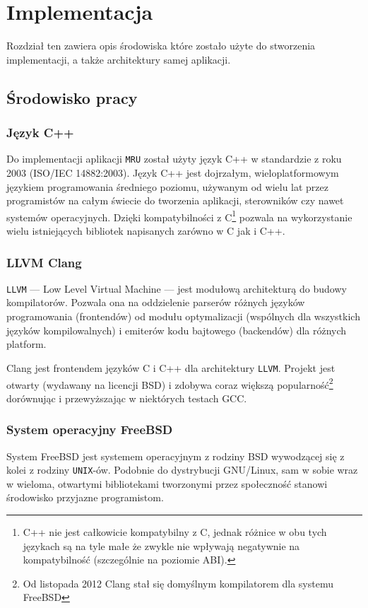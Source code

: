 \chapter{Implementacja}
\par
Rozdział ten zawiera opis środowiska które zostało użyte do stworzenia implementacji, a także architektury samej aplikacji.

\section{Środowisko pracy}

\subsection{Język C++}
\par
Do implementacji aplikacji \texttt{MRU} został użyty język C++ w standardzie z roku 2003 (ISO/IEC 14882:2003).
Język C++ jest dojrzałym, wieloplatformowym językiem programowania średniego poziomu, używanym od wielu lat przez programistów na całym świecie do tworzenia aplikacji, sterowników czy nawet systemów operacyjnych. Dzięki kompatybilności z C\footnote{C++ nie jest całkowicie kompatybilny z  C, jednak różnice w obu tych językach są na tyle małe że zwykle nie wpływają negatywnie na kompatybilność (szczególnie na poziomie ABI).} pozwala na wykorzystanie wielu istniejących bibliotek napisanych zarówno w C jak i C++.

\subsection{LLVM Clang}
\par
\texttt{LLVM} --- Low Level Virtual Machine --- jest modułową architekturą do budowy kompilatorów. Pozwala ona na oddzielenie parserów różnych języków programowania (frontendów) od modułu optymalizacji (wspólnych dla wszystkich języków kompilowalnych) i emiterów kodu bajtowego (backendów) dla różnych platform.

\par
Clang jest frontendem języków C i C++ dla architektury \texttt{LLVM}. Projekt jest otwarty (wydawany na licencji BSD) i zdobywa coraz większą popularność\footnote{Od listopada 2012 Clang stał się domyślnym kompilatorem dla systemu FreeBSD} dorównując i przewyższając w niektórych testach GCC.

\subsection{System operacyjny FreeBSD}
\par
System FreeBSD jest systemem operacyjnym z rodziny BSD wywodzącej się z kolei z rodziny \texttt{UNIX}-ów. Podobnie do dystrybucji GNU/Linux, sam w sobie wraz w wieloma, otwartymi bibliotekami tworzonymi przez społeczność stanowi środowisko przyjazne programistom.

